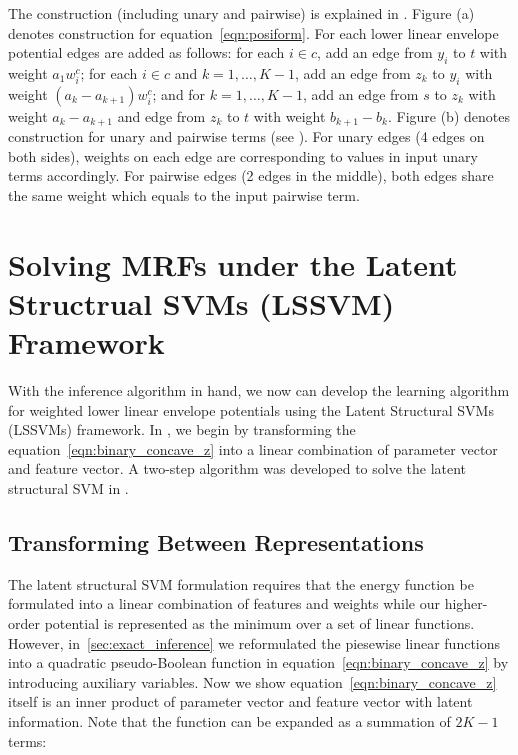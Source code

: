 The construction (including unary and pairwise) is explained in
. Figure (a) denotes construction for
equation~\eqref{eqn:posiform}. For each lower linear envelope
potential edges are added as follows: for each $i \in c$, add an
edge from $y_i$ to $t$ with weight $a_1 w^c_i$; for each $i \in
c$ and $k = 1, \ldots, K-1$, add an edge from $z_k$ to $y_i$ with
weight $(a_{k} - a_{k+1}) w^c_i$; and for $k = 1, \ldots, K-1$,
add an edge from $s$ to $z_k$ with weight $a_k - a_{k+1}$ and
edge from $z_k$ to $t$ with weight $b_{k+1} - b_k$. Figure (b)
denotes construction for unary and pairwise terms (see
\cite{Kolmogorov:PAMI04}). For unary edges (4 edges on both
sides), weights on each edge are corresponding to values in input
unary terms accordingly. For pairwise edges (2 edges in the
middle), both edges share the same weight which equals to the
input pairwise term.

\section[Solving MRFs under LSSVMs]{Solving MRFs under the Latent
  Structrual SVMs (LSSVM) Framework}
\label{sec:opt}

With the inference algorithm in hand, we now can develop the
learning algorithm for weighted lower linear envelope potentials
using the Latent Structural SVMs (LSSVMs) framework. In
, we begin by transforming the
equation~\eqref{eqn:binary_concave_z} into a linear combination
of parameter vector and feature vector. A two-step algorithm was
developed to solve the latent structural SVM in
.


\subsection{Transforming Between Representations}
\label{sec:learning}

The latent structural SVM formulation requires that the energy
function be formulated into a linear combination of features and
weights while our higher-order potential is represented as the
minimum over a set of linear functions. However,
in~\ref{sec:exact_inference} we reformulated the piesewise linear
functions into a quadratic pseudo-Boolean function in
equation~\eqref{eqn:binary_concave_z} by introducing auxiliary
variables. Now we show equation~\eqref{eqn:binary_concave_z}
itself is an inner product of parameter vector and feature vector
with latent information. Note that the function can be expanded
as a summation of $2K-1$ terms:

